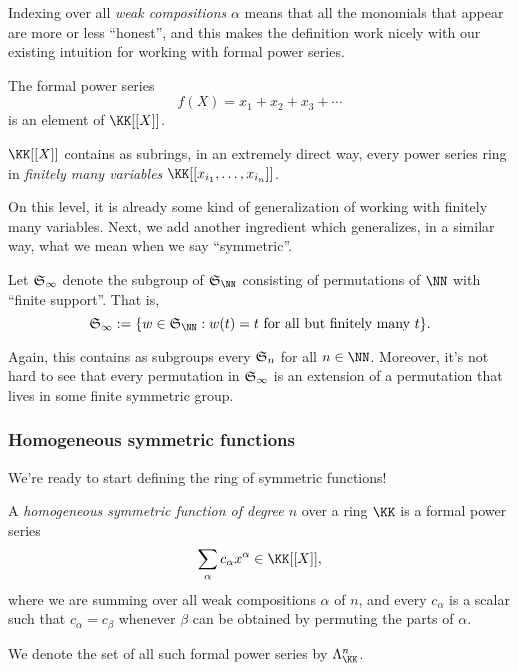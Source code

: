 \documentclass{article}
\newcommand{\frkS}{\ensuremath\mathfrak{S}}
\begin{document}
Indexing over all \textit{weak compositions} $\alpha$ means that all the monomials that appear are more or less ``honest'', and this makes the definition work nicely with our existing intuition for working with formal power series.

\begin{example}
    The formal power series
    \[
        f(X) = x_1 + x_2 + x_3 + \cdots
    \]
    is an element of $\KK[[X]]$.
\end{example}

$\KK[[X]]$ contains as subrings, in an extremely direct way, every power series ring in \textit{finitely many variables} $\KK[[x_{i_1}, \ldots, x_{i_n}]]$.

On this level, it is already some kind of generalization of working with finitely many variables.
Next, we add another ingredient which generalizes, in a similar way, what we mean when we say ``symmetric''.

\begin{definition}
    Let $\frkS_\infty$ denote the subgroup of $\frkS_\NN$ consisting of permutations of $\NN$ with ``finite support''.
    That is,
    \[
        \frkS_\infty := \{w \in \frkS_\NN: w(t) = t\text{ for all but finitely many }t\}.
    \]
\end{definition}

Again, this contains as subgroups every $\frkS_n$ for all $n \in \NN$.
Moreover, it's not hard to see that every permutation in $\frkS_\infty$ is an extension of a permutation that lives in some finite symmetric group.

\subsubsection{Homogeneous symmetric functions}

We're ready to start defining the ring of symmetric functions!

\begin{definition}
    A \textit{homogeneous symmetric function of degree $n$} over a ring $\KK$ is a formal power series
    \[
        \sum_\alpha c_\alpha x^\alpha \in \KK[[X]],
    \]
    where we are summing over all weak compositions $\alpha$ of $n$, and every $c_\alpha$ is a scalar such that $c_\alpha = c_\beta$ whenever $\beta$ can be obtained by permuting the parts of $\alpha$.
    
    We denote the set of all such formal power series by $\Lambda_\KK^n$.
\end{definition}
\end{document}
